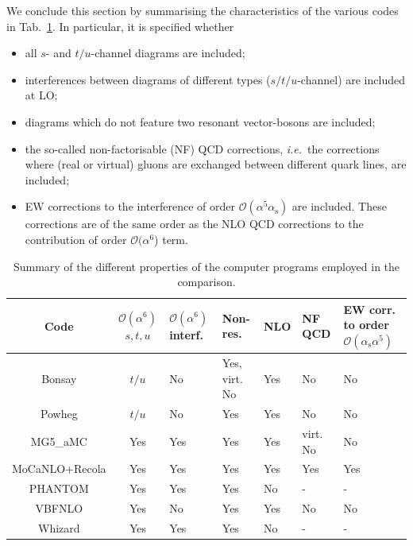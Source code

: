 \documentclass[twocolumn,epjc3]{svjour3} %
\newcommand{\alphas}{\ensuremath{\alpha_\text{s}}\xspace}
\newlength{\width}
\begin{document}
    We conclude this section by summarising the characteristics of the various codes in Tab.~\ref{tab:wg1_codes}.
    In particular, it is specified whether
    \begin{itemize}
        \item all $s$- and $t/u$-channel diagrams are included;
        \item interferences between diagrams of different types ($s/t/u$-channel) are included at LO;
        \item diagrams which do not feature two resonant vector-bosons are included;
        \item the so-called non-factoris\-able (NF) QCD corrections, \emph{i.e.}\ the corrections where (real or virtual) gluons are exchanged between different quark lines,
            are included;
        \item EW corrections to the interference of order $\mathcal O (\alpha^5\alphas)$ are included.
        These corrections are of the same order as the NLO QCD corrections to the contribution of order $\mathcal O (\alpha^6$) term.
    \end{itemize}

    \begin{table}[ht!]
        \footnotesize
        \begin{tabularx}{\textwidth}{c|c|X|X|X|X|X}
            Code  &  $\mathcal O(\alpha^6)$ $s, t, u$  &  $\mathcal O(\alpha^6)$ interf.  &  Non-res.  & NLO &  NF QCD  &  EW corr. to order $\mathcal O(\alphas \alpha^5)$  \\
            \hline
            \hline
            {\sc Bonsay}        &  $t/u$    &  No       &  Yes, virt. No    &  Yes   & No       &  No  \\
            {\sc Powheg}        &  $t/u$    &  No       &  Yes              &  Yes   & No       &  No  \\
            {\sc MG5\_aMC}      &  Yes      &  Yes      &  Yes              &  Yes   & virt. No &  No \\
            {\sc MoCaNLO+Recola}&  Yes      &  Yes      &  Yes              &  Yes   & Yes      &  Yes  \\
            {\sc PHANTOM}       &  Yes      &  Yes      &  Yes              &  No    & -        & - \\
            {\sc VBFNLO}        &  Yes      &  No       &  Yes              &  Yes   & No       &  No  \\
            {\sc Whizard}       &  Yes      &  Yes      &  Yes              &  No    & -        & - \\
        \end{tabularx}
        \caption{\label{tab:wg1_codes} Summary of the different properties of the computer programs employed in the comparison.}
    \end{table}
\end{document}
